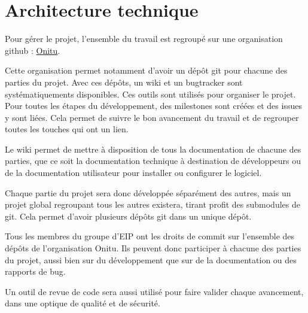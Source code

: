 \section{Architecture technique}

Pour gérer le projet, l'ensemble du travail est regroupé sur une organisation github : \href{https://github.com/onitu/}{Onitu}.

Cette organisation permet notamment d'avoir un dépôt git pour chacune des parties du projet. Avec ces dépôts, un wiki et un bugtracker sont systématiquements disponibles. Ces outils sont utilisés pour organiser le projet. Pour toutes les étapes du développement, des milestones sont créées et des issues y sont liées. Cela permet de suivre le bon avancement du travail et de regrouper toutes les touches qui ont un lien.

Le wiki permet de mettre à disposition de tous la documentation de chacune des parties, que ce soit la documentation technique à destination de développeurs ou de la documentation utilisateur pour installer ou configurer le logiciel.

Chaque partie du projet sera donc développée séparément des autres, mais un projet global regroupant tous les autres existera, tirant profit des submodules de git. Cela permet d'avoir plusieurs dépôts git dans un unique dépôt.

Tous les membres du groupe d'EIP ont les droits de commit sur l'ensemble des dépôts de l'organisation Onitu. Ils peuvent donc participer à chacune des parties du projet, aussi bien sur du développement que sur de la documentation ou des rapports de bug.

Un outil de revue de code sera aussi utilisé pour faire valider chaque avancement, dans une optique de qualité et de sécurité.
